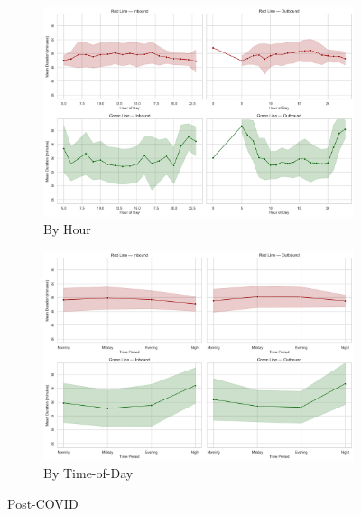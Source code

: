 \begin{figure}[H]
  \centering
  \begin{subfigure}[t]{0.49\textwidth}
    \centering
    \includegraphics[width=\textwidth]{figures/appendix_figures/journey_duration/duration_hourly_combined_postcovid.png}
    \caption*{By Hour}
  \end{subfigure}
  \hfill
  \begin{subfigure}[t]{0.49\textwidth}
    \centering
    \includegraphics[width=\textwidth]{figures/appendix_figures/journey_duration/duration_period_combined_postcovid.png}
    \caption*{By Time-of-Day}
  \end{subfigure}
  \caption{Post-COVID}
\end{figure}
